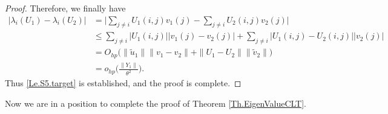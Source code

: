 \documentclass[11pt, reqno]{amsart}
\numberwithin{equation}{section}
\begin{document}
\begin{proof}
Therefore, we finally have
\begin{align*}
\big|\lambda_i(U_1)-\lambda_i(U_2)\big|
&= \Big|\sum_{j\ne i} U_1(i,j)v_1(j)- \sum_{j\ne i} U_2(i,j)v_2(j)\Big|\\
&\le \sum_{j\ne i} |U_1(i,j)||v_1(j)-v_2(j)| + \sum_{j\ne i} |U_1(i,j)-U_2(i,j)||v_2(j)|\\
&= O_{hp}\Big(\|\tilde{u}_1\|\|v_1-v_2\| + \|U_1-U_2\|\|\tilde{v}_2\|\Big)\\
&= o_{hp}\Big(\frac{\|Y_1\|}{\theta^2}\Big).
\end{align*}
Thus \eqref{Le.S5.target} is established, and the proof is complete.
\end{proof}

Now we are in a position to complete the proof of Theorem \ref{Th.EigenValueCLT}.
\end{document}
